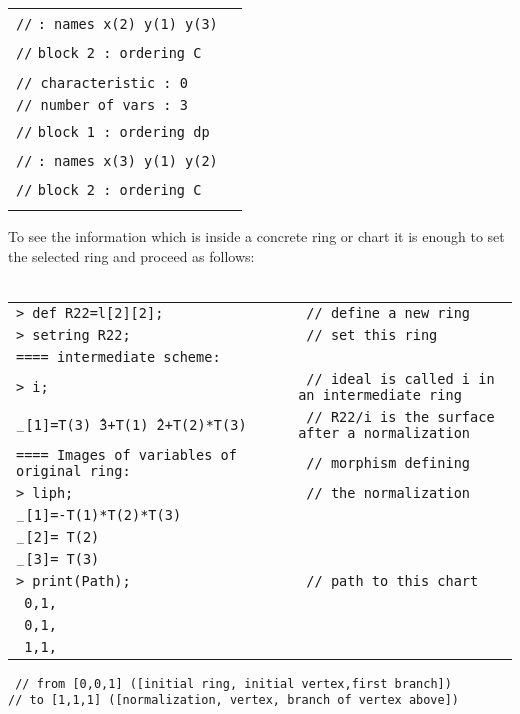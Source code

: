 \documentclass{article}
\begin{document}
\begin{table}[htbp]
\begin{tabular}{ll}
		\texttt{//} \hspace*{2.7cm}  \texttt{: names    x(2) y(1) y(3)}  &   \\
		\texttt{//}  \hspace*{1.2cm}      \texttt{block   2 : ordering C} &   \\ \\
		\texttt{// characteristic : 0}         &  \\
		\texttt{// number of vars : 3}  &   \\
		\texttt{//} \hspace*{1.2cm} \texttt{block   1 : ordering dp}  &   \\
		\texttt{//} \hspace*{2.7cm}  \texttt{: names    x(3) y(1) y(2)}  &   \\
		\texttt{//}  \hspace*{1.2cm}      \texttt{block   2 : ordering C} &   \\ \\
	\end{tabular}
\end{table}



\begin{table}[htbp]
To see the information which is inside a concrete ring or chart it is enough to set the selected ring and proceed as follows: \\ \\
\begin{tabular}{ll}
\texttt{> def R22=l[2][2]; } &     \texttt{ // define a new ring} \\
\texttt{> setring R22;}  &  \texttt{ // set this ring}  \\
\texttt{==== intermediate scheme:}  &   \\
\texttt{> i;}  &  \texttt{ // ideal is called i in an intermediate ring}  \\
\texttt{$_{-}$[1]=T(3)\^\ \hspace*{-0.1cm}3+T(1)\^\ \hspace*{-0.1cm}2+T(2)*T(3)}  
&   \texttt{ //  R22/i is the surface after a normalization}  \\
\texttt{==== Images of variables of original ring:}  & \texttt{ // morphism defining}  \\
\texttt{> liph;}  &   \texttt{ // the normalization}  \\
\texttt{$_{-}$[1]=-T(1)*T(2)*T(3)} &   \\
\texttt{$_{-}$[2]= T(2)} &   \\
\texttt{$_{-}$[3]= T(3)} &   \\
\texttt{> print(Path);}  &   \texttt{ //  path to this chart}   \\
\texttt{ 0,1,}  &   \\
\texttt{ 0,1,}  &   \\
\texttt{ 1,1,}  &   \\
\end{tabular}
\texttt{  
	// from [0,0,1] ([initial ring, initial vertex,first branch])\\
	// to [1,1,1] ([normalization, vertex, branch of vertex above]) 
	}
\end{table} 
\end{document}
